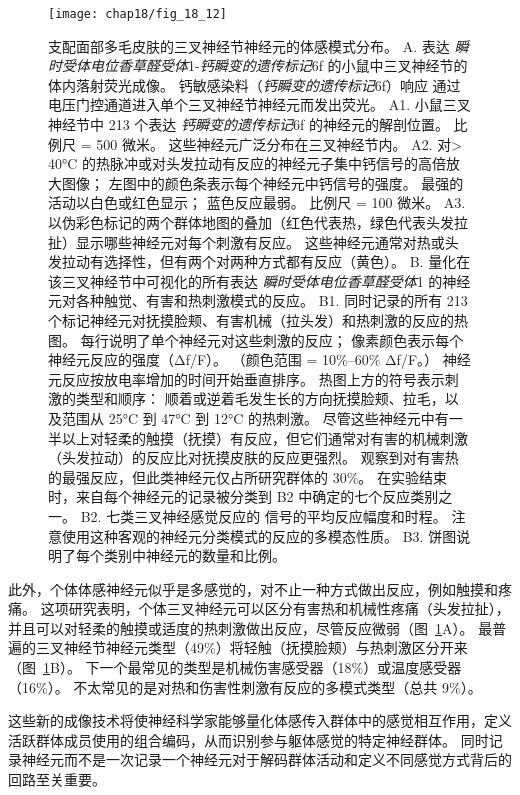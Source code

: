 \begin{figure}[htbp]
	\centering
	\texttt{[image: chap18/fig\_18\_12]}
	\caption{支配面部多毛皮肤的三叉神经节神经元的体感模式分布\cite{ghitani2017specialized}。
		A. 表达 \textit{瞬时受体电位香草醛受体}1-\textit{钙瞬变的遗传标记}6f 的小鼠中三叉神经节的体内落射荧光成像。 
		钙敏感染料（\textit{钙瞬变的遗传标记}6f）响应  通过电压门控通道进入单个三叉神经节神经元而发出荧光。
		A1. 小鼠三叉神经节中 213 个表达 \textit{钙瞬变的遗传标记}6f 的神经元的解剖位置。
		比例尺 = 500 微米。
		这些神经元广泛分布在三叉神经节内。 
		A2. 对> 40°C 的热脉冲或对头发拉动有反应的神经元子集中钙信号的高倍放大图像；
		左图中的颜色条表示每个神经元中钙信号的强度。
		最强的活动以白色或红色显示；
		蓝色反应最弱。
		比例尺 = 100 微米。
		A3. 以伪彩色标记的两个群体地图的叠加（红色代表热，绿色代表头发拉扯）显示哪些神经元对每个刺激有反应。
		这些神经元通常对热或头发拉动有选择性，但有两个对两种方式都有反应（黄色）。
		B. 量化在该三叉神经节中可视化的所有表达 \textit{瞬时受体电位香草醛受体}1 的神经元对各种触觉、有害和热刺激模式的反应。
		B1. 同时记录的所有 213 个标记神经元对抚摸脸颊、有害机械（拉头发）和热刺激的反应的热图。
		每行说明了单个神经元对这些刺激的反应；
		像素颜色表示每个神经元反应的强度（Δf/F）。
		（颜色范围 = 10\%–60\% Δf/F。）
		神经元反应按放电率增加的时间开始垂直排序。
		热图上方的符号表示刺激的类型和顺序：
		顺着或逆着毛发生长的方向抚摸脸颊、拉毛，以及范围从 25°C 到 47°C 到 12°C 的热刺激。
		尽管这些神经元中有一半以上对轻柔的触摸（抚摸）有反应，但它们通常对有害的机械刺激（头发拉动）的反应比对抚摸皮肤的反应更强烈。
		观察到对有害热的最强反应，但此类神经元仅占所研究群体的 30\%。
		在实验结束时，来自每个神经元的记录被分类到 B2 中确定的七个反应类别之一。
		B2. 七类三叉神经感觉反应的  信号的平均反应幅度和时程。 注意使用这种客观的神经元分类模式的反应的多模态性质。
		B3. 饼图说明了每个类别中神经元的数量和比例。}
	\label{fig:18_12}
\end{figure}


此外，个体体感神经元似乎是多感觉的，对不止一种方式做出反应，例如触摸和疼痛。
这项研究表明，个体三叉神经元可以区分有害热和机械性疼痛（头发拉扯），并且可以对轻柔的触摸或适度的热刺激做出反应，尽管反应微弱（图~\ref{fig:18_12}A）。
最普遍的三叉神经节神经元类型（49\%）将轻触（抚摸脸颊）与热刺激区分开来（图~\ref{fig:18_12}B）。 
下一个最常见的类型是机械伤害感受器（18\%）或温度感受器（16\%）。
不太常见的是对热和伤害性刺激有反应的多模式类型（总共 9\%）。


这些新的成像技术将使神经科学家能够量化体感传入群体中的感觉相互作用，定义活跃群体成员使用的组合编码，从而识别参与躯体感觉的特定神经群体。
同时记录神经元而不是一次记录一个神经元对于解码群体活动和定义不同感觉方式背后的回路至关重要。



